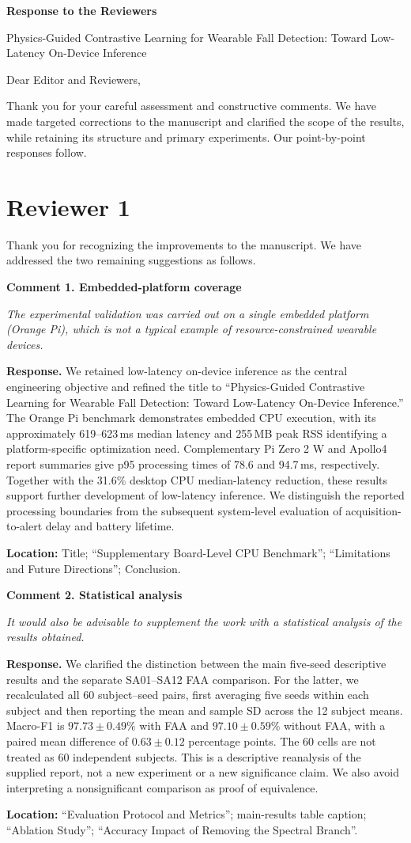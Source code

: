 \documentclass[11pt]{article}
\newcommand{\ReviewerComment}[1]{\textit{#1}\par}
\newcommand{\AuthorResponse}[1]{\textbf{Response.} #1\par}
\newcommand{\ManuscriptChange}[1]{{\small\textbf{Location:} #1}\par}
\newcommand{\commentheading}[1]{\par\medskip\textbf{#1}\par\nopagebreak[4]}
\begin{document}
\begin{center}
{\Large\bfseries Response to the Reviewers}\par
\smallskip
Physics-Guided Contrastive Learning for Wearable Fall Detection: Toward Low-Latency On-Device Inference
\end{center}

Dear Editor and Reviewers,

Thank you for your careful assessment and constructive comments. We have made targeted corrections to the manuscript and clarified the scope of the results, while retaining its structure and primary experiments. Our point-by-point responses follow.

\section*{Reviewer 1}

Thank you for recognizing the improvements to the manuscript. We have addressed the two remaining suggestions as follows.

\commentheading{Comment 1. Embedded-platform coverage}
\ReviewerComment{The experimental validation was carried out on a single embedded platform (Orange Pi), which is not a typical example of resource-constrained wearable devices.}
\AuthorResponse{We retained low-latency on-device inference as the central engineering objective and refined the title to ``Physics-Guided Contrastive Learning for Wearable Fall Detection: Toward Low-Latency On-Device Inference.'' The Orange Pi benchmark demonstrates embedded CPU execution, with its approximately 619--623\,ms median latency and 255\,MB peak RSS identifying a platform-specific optimization need. Complementary Pi Zero 2 W and Apollo4 report summaries give p95 processing times of 78.6 and 94.7\,ms, respectively. Together with the 31.6\% desktop CPU median-latency reduction, these results support further development of low-latency inference. We distinguish the reported processing boundaries from the subsequent system-level evaluation of acquisition-to-alert delay and battery lifetime.}
\ManuscriptChange{Title; ``Supplementary Board-Level CPU Benchmark''; ``Limitations and Future Directions''; Conclusion.}

\commentheading{Comment 2. Statistical analysis}
\ReviewerComment{It would also be advisable to supplement the work with a statistical analysis of the results obtained.}
\AuthorResponse{We clarified the distinction between the main five-seed descriptive results and the separate SA01--SA12 FAA comparison. For the latter, we recalculated all 60 subject--seed pairs, first averaging five seeds within each subject and then reporting the mean and sample SD across the 12 subject means. Macro-F1 is $97.73\pm0.49\%$ with FAA and $97.10\pm0.59\%$ without FAA, with a paired mean difference of $0.63\pm0.12$ percentage points. The 60 cells are not treated as 60 independent subjects. This is a descriptive reanalysis of the supplied report, not a new experiment or a new significance claim. We also avoid interpreting a nonsignificant comparison as proof of equivalence.}
\ManuscriptChange{``Evaluation Protocol and Metrics''; main-results table caption; ``Ablation Study''; ``Accuracy Impact of Removing the Spectral Branch''.}
\end{document}
